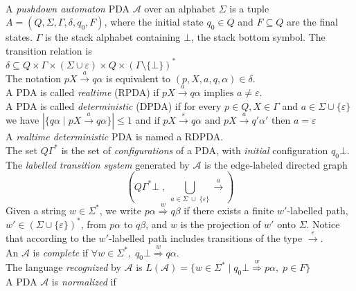 \documentclass[3p,11pt]{elsarticle}
\begin{document}
\\
A \emph{pushdown automaton} PDA $\mathcal{A}$ over an alphabet $\Sigma$ is a tuple $A= (Q, \Sigma, \Gamma, \delta, q_0, F)$, where the initial state $q_0\in Q$ and $F \subseteq Q$ are the final states. $\Gamma$ is the stack alphabet containing $\bot$, the stack bottom symbol. The transition relation is
\\
$ \delta\subseteq Q \times \Gamma \times (\Sigma \cup {\varepsilon})\times Q \times (\Gamma\setminus\{\bot\})^\ast $
\\
The notation \cite{conf/mfcs/NowotkaS07} $pX \stackrel a \to q \alpha$ is equivalent to $(p, X, a, q, \alpha) \in \delta$.
\\
A PDA is called \emph{realtime} (RPDA) if $ pX \stackrel a \to q \alpha  \text{ implies } a \neq \varepsilon $.
\\
A PDA is called \emph{deterministic} (DPDA) if for every  $p\in Q, X\in \Gamma $ and $a \in \Sigma \cup \{\varepsilon\}$ we have $  |\{q\alpha \mid pX \stackrel a \to q \alpha\}| \leq  1 $ and $
  \text{if }pX \stackrel \varepsilon \to q \alpha \text{ and }pX \stackrel a \to q' \alpha' \text{ then } a= \varepsilon
$
\\
A \emph{realtime deterministic} PDA is named a RDPDA.
\\
The set $Q\Gamma^\ast$ is the set of \emph{configurations} of a PDA, with \emph{initial} configuration $q_0\bot$.
\\
The \emph{labelled transition system} generated by $\mathcal{A}$ is the edge-labeled directed graph
$$
\left( Q\Gamma^\ast\bot \;, \; \bigcup_{a \in \Sigma \; \cup \; \{\varepsilon\} } \stackrel a\longrightarrow \right)
$$
Given a string $w\in \Sigma^\ast$, we write $p \alpha \stackrel w \Longrightarrow q \beta$ if there exists a finite $w'$-labelled path, $w'\in (\Sigma  \cup \{\varepsilon\})^\ast$, from $p \alpha$ to $q \beta$, and $w$ is the projection of $w'$ onto $\Sigma$. Notice that according to \cite{conf/mfcs/NowotkaS07} the $w'$-labelled path includes transitions of the type $\stackrel \varepsilon\longrightarrow$.
\\
An $\mathcal{A}$ is \emph{complete} if $ \forall w \in \Sigma^\ast, \; q_0\bot \stackrel w \Longrightarrow q \alpha$.
\\
The language \emph{recognized} by $\mathcal{A}$ is $ L(\mathcal{A})= \{w \in \Sigma^\ast \mid q_0\bot \stackrel w \Longrightarrow p \alpha,\; p\in F\} $
\\
A PDA $\mathcal{A}$ is \emph{normalized} \cite{conf/mfcs/NowotkaS07} if
\end{document}
